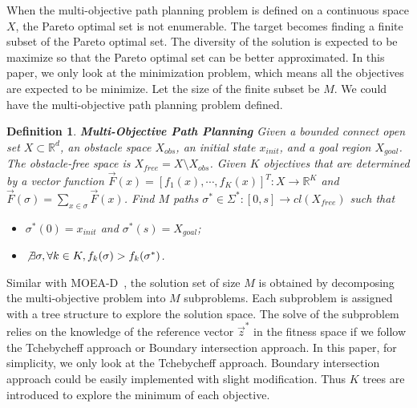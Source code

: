 \documentclass[conference]{IEEEtran}
\newtheorem{defn}{Definition}
\begin{document}
When the multi-objective path planning problem is defined on a continuous space $ X $, the Pareto optimal set is not enumerable.
The target becomes finding a finite subset of the Pareto optimal set.
The diversity of the solution is expected to be maximize so that the Pareto optimal set can be better approximated.
In this paper, we only look at the minimization problem, which means all the objectives are expected to be minimize.
Let the size of the finite subset be $ M $.
We could have the multi-objective path planning problem defined.
\begin{defn}{ \textbf{Multi-Objective Path Planning} }
Given a bounded connect open set $ X \subset \mathbb{R}^{d} $, an obstacle space $ X_{obs} $, an initial state $ x_{init} $, and a goal region $ X_{goal} $.
The obstacle-free space is $ X_{free} = X \setminus X_{obs} $.
Given $ K $ objectives that are determined by a vector function
$ \vec{F}(x) = [ f_{1} (x), \cdots , f_{K}(x) ]^{T} : X \rightarrow \mathbb{R}^{K} $ and 
$ \vec{F}(\sigma) = \sum_{x \in \sigma} \vec{F}(x) $.
Find $ M $ paths $ \sigma^{*} \in \Sigma^{*}  : [0, s] \rightarrow cl(  X_{free} ) $ such that
\begin{itemize}
	\item $ \sigma^{*} (0) = x_{init} $ and $ \sigma^{*} (s) = X_{goal}  $;
	\item $ \not \exists \sigma , \forall k \in K, f_{k} (\sigma) > f_{k} (\sigma^{*}) $.
\end{itemize}
\end{defn}

Similar with MOEA-D~\cite{4358754}, the solution set of size $ M $ is obtained by decomposing the multi-objective problem into $ M $ subproblems.
Each subproblem is assigned with a tree structure to explore the solution space.
The solve of the subproblem relies on the knowledge of the reference vector $ \vec{z}^{*} $ in the fitness space if we follow the Tchebycheff approach or Boundary intersection approach.
In this paper, for simplicity, we only look at the Tchebycheff approach.
Boundary intersection approach could be easily implemented with slight modification.
Thus $ K $ trees are introduced to explore the minimum of each objective.
\end{document}
